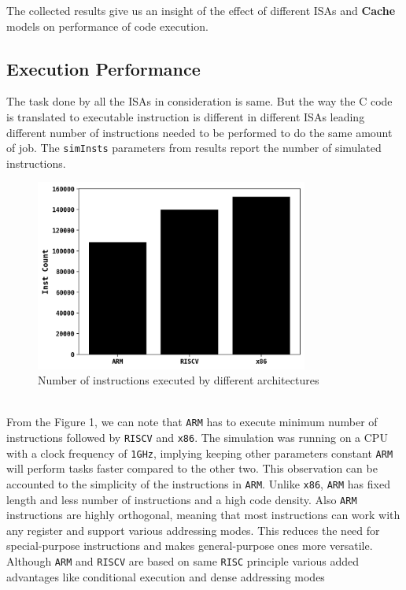 The collected results give us an insight of the effect of different ISAs and \textbf{Cache} models
on performance of code execution.
\subsection{Execution Performance}
The task done by all the ISAs in consideration is same. But the way the C code is translated to
executable instruction is different in different ISAs leading different number of instructions needed to be
performed to do the same amount of job. The \texttt{simInsts} parameters from results report the number 
of simulated instructions.
\begin{figure}[h]
    \centering
    \includegraphics[width=0.8\textwidth]{./figs/1.png}
    \caption{Number of instructions executed by different architectures}
    \label{fig:Number of instructions executed by different architectures}
\end{figure}\\
From the Figure 1, we can note that \texttt{ARM} has to execute minimum number of instructions followed
by \texttt{RISCV} and \texttt{x86}. The simulation was running on a CPU with a clock frequency of
\texttt{1GHz}, implying keeping other parameters constant \texttt{ARM} will perform tasks faster compared to
the other two. This observation can be accounted to the simplicity of the instructions in \texttt{ARM}.
Unlike \texttt{x86}, \texttt{ARM} has fixed length and less number of instructions and a high code density.
Also \texttt{ARM} instructions are highly orthogonal, meaning that most instructions can work with 
any register and support various addressing modes. This reduces the need for special-purpose instructions 
and makes general-purpose ones more versatile. Although \texttt{ARM} and \texttt{RISCV} are based on same 
\texttt{RISC} principle various added advantages like conditional execution and dense addressing modes
